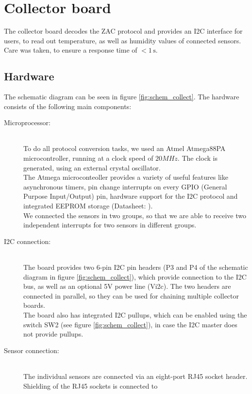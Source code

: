 \documentclass[a4paper]{scrreprt}
\begin{document}
\section{Collector board}
The collector board decodes the ZAC protocol and provides an I2C interface
for users, to read out temperature, as well as humidity values of connected sensors.
Care was taken, to ensure a response time of $<1\,\mathrm{s}$.
\subsection{Hardware}
The schematic diagram can be seen in figure \ref{fig:schem_collect}. The hardware consists of the following main components:
\begin{description}
  \item[Microprocessor:]\hspace{1cm}\\
    To do all protocol conversion tasks, we used an Atmel Atmega88PA
    microcontroller, running at a clock speed of $20MHz$. The clock
    is generated, using an external crystal oscillator.\\
    The Atmega microconteoller provides a variety of useful features
    like asynchronous timers, pin change interrupts on every GPIO (General Purpose Input/Output)
    pin, hardware support for the I2C protocol and integrated EEPROM
    storage (Datasheet: \cite{atmega88}).\\
    We connected the sensors in two groups, so that we are able to
    receive two independent interrupts for two sensors in different
    groups.
  \item[I2C connection:]\hspace{1cm}\\
    The board provides two 6-pin I2C pin headers (P3 and P4 of the schematic diagram in figure \ref{fig:schem_collect}), which
    provide connection to the I2C bus, as well as an optional 5V
    power line (Vi2c). The two headers are connected in parallel,
    so they can be used for chaining multiple collector boards.\\
    The board also has integrated I2C pullups, which can be enabled
    using the switch SW2 (see figure \ref{fig:schem_collect}), in case the I2C master does not provide
    pullups.
  \item[Sensor connection:]\hspace{1cm}\\
    The individual sensors are connected via an eight-port RJ45
    socket header. Shielding of the RJ45 sockets is connected to

\end{description}
\end{document}
